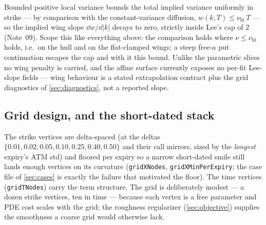 \documentclass[11pt]{article}
\begin{document}
\begin{remark}
\label{rem:lee}
Bounded positive local variance bounds the total implied variance uniformly
in strike --- by comparison with the constant-variance diffusion,
$w(k,T)\le\nu_{\mathrm{hi}}\,T$ --- so the implied wing slope
$\dd w/\dd|k|$ decays to zero, strictly inside Lee's cap of $2$ (Note~09).
Scope this like everything above: the comparison holds where
$\nu\le\nu_{\mathrm{hi}}$ holds, i.e.\ on the hull and on the flat-clamped
wings; a steep free-$a$ put continuation escapes the cap and with it this
bound. Unlike the parametric slices no wing penalty is carried, and the
affine surface currently exposes no per-fit Lee-slope fields --- wing
behaviour is a stated extrapolation contract plus the grid diagnostics of
\cref{sec:diagnostics}, not a reported slope.
\end{remark}

\subsection{Grid design, and the short-dated stack}
\label{sec:griddesign}

The strike vertices are delta-spaced (at the deltas
$\{0.01,0.02,0.05,0.10,0.25,0.40,0.50\}$ and their call mirrors, sized by the
\emph{longest} expiry's ATM std) and floored per expiry so a narrow short-dated
smile still lands enough vertices on its curvature (\texttt{gridXNodes},
\texttt{gridXMinPerExpiry}; the case file of \cref{sec:cases} is exactly the
failure that motivated the floor). The time vertices (\texttt{gridTNodes})
carry the term structure. The grid is deliberately modest --- a dozen strike
vertices, ten in time --- because each vertex is a free parameter and PDE cost
scales with the grid; the roughness regularizer (\cref{sec:objective}) supplies
the smoothness a coarse grid would otherwise lack.
\end{document}
